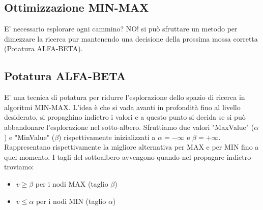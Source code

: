 \documentclass{article}
\begin{document}
\subsection{Ottimizzazione MIN-MAX}
E' necessario esplorare ogni cammino? NO! si può sfruttare un metodo per dimezzare la ricerca pur mantenendo una decisione della prossima mossa corretta (Potatura ALFA-BETA).

\subsection{Potatura ALFA-BETA}
E' una tecnica di potatura per ridurre l’esplorazione dello spazio di ricerca in algoritmi MIN-MAX. L'idea è che si vada avanti in profondità fino al livello desiderato, si propaghino indietro i valori e a questo punto si decida se si può abbandonare l’esplorazione nel sotto-albero. Sfruttiamo due valori "MaxValue" ($\alpha$) e "MinValue" ($\beta$) rispettivamente inizializzati a $\alpha=-\infty$ e $\beta=+\infty$. Rappresentano rispettivamente la migliore alternativa per MAX e per MIN fino a quel momento. \newline
I tagli del sottoalbero avvengono quando nel propagare indietro troviamo: 
\begin{itemize}
    \item $v \geq \beta$ per i nodi MAX (taglio $\beta$)
    \item $v \leq \alpha$ per i nodi MIN (taglio $\alpha$) 
\end{itemize}
\end{document}
